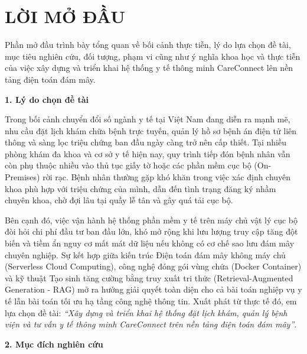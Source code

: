 \chapter*{LỜI MỞ ĐẦU}

Phần mở đầu trình bày tổng quan về bối cảnh thực tiễn, lý do lựa chọn đề tài, mục tiêu nghiên cứu, đối tượng, phạm vi cũng như ý nghĩa khoa học và thực tiễn của việc xây dựng và triển khai hệ thống y tế thông minh CareConnect lên nền tảng điện toán đám mây.

\textbf{1. Lý do chọn đề tài}

Trong bối cảnh chuyển đổi số ngành y tế tại Việt Nam đang diễn ra mạnh mẽ, nhu cầu đặt lịch khám chữa bệnh trực tuyến, quản lý hồ sơ bệnh án điện tử liên thông và sàng lọc triệu chứng ban đầu ngày càng trở nên cấp thiết. Tại nhiều phòng khám đa khoa và cơ sở y tế hiện nay, quy trình tiếp đón bệnh nhân vẫn còn phụ thuộc nhiều vào thủ tục giấy tờ hoặc các phần mềm cục bộ (On-Premises) rời rạc. Bệnh nhân thường gặp khó khăn trong việc xác định chuyên khoa phù hợp với triệu chứng của mình, dẫn đến tình trạng đăng ký nhầm chuyên khoa, chờ đợi lâu tại quầy lễ tân và gây quá tải cục bộ.

Bên cạnh đó, việc vận hành hệ thống phần mềm y tế trên máy chủ vật lý cục bộ đòi hỏi chi phí đầu tư ban đầu lớn, khó mở rộng khi lưu lượng truy cập tăng đột biến và tiềm ẩn nguy cơ mất mát dữ liệu nếu không có cơ chế sao lưu đám mây chuyên nghiệp. Sự kết hợp giữa kiến trúc Điện toán đám mây không máy chủ (Serverless Cloud Computing), công nghệ đóng gói vùng chứa (Docker Container) và kỹ thuật Tạo sinh tăng cường bằng truy xuất tri thức (Retrieval-Augmented Generation - RAG) mở ra hướng giải quyết toàn diện cho cả bài toán nghiệp vụ y tế lẫn bài toán tối ưu hạ tầng công nghệ thông tin. Xuất phát từ thực tế đó, em lựa chọn đề tài: \textit{``Xây dựng và triển khai hệ thống đặt lịch khám, quản lý bệnh viện và tư vấn y tế thông minh CareConnect trên nền tảng điện toán đám mây''}.

\textbf{2. Mục đích nghiên cứu}

